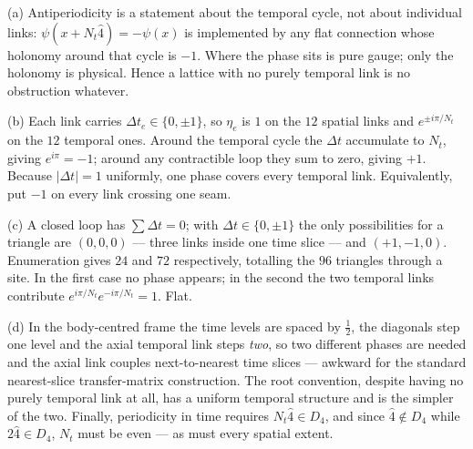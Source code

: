 {(a) Antiperiodicity is a statement about the temporal cycle, not about
individual links: $\psi(x+N_t\hat4)=-\psi(x)$ is implemented by any flat
connection whose holonomy around that cycle is $-1$. Where the phase sits is
pure gauge; only the holonomy is physical. Hence a lattice with no purely
temporal link is no obstruction whatever.

(b) Each link carries $\Delta t_e\in\{0,\pm1\}$, so $\eta_e$ is $1$ on the $12$
spatial links and $e^{\pm i\pi/N_t}$ on the $12$ temporal ones. Around the
temporal cycle the $\Delta t$ accumulate to $N_t$, giving $e^{i\pi}=-1$; around
any contractible loop they sum to zero, giving $+1$. Because $|\Delta t|=1$
uniformly, one phase covers every temporal link. Equivalently, put $-1$ on every
link crossing one seam.

(c) A closed loop has $\sum\Delta t=0$; with $\Delta t\in\{0,\pm1\}$ the only
possibilities for a triangle are $(0,0,0)$ --- three links inside one time slice
--- and $(+1,-1,0)$. Enumeration gives $24$ and $72$ respectively, totalling the
$96$ triangles through a site. In the first case no phase appears; in the second
the two temporal links contribute $e^{i\pi/N_t}e^{-i\pi/N_t}=1$. Flat.

(d) In the body-centred frame the time levels are spaced by $\tfrac12$, the
diagonals step one level and the axial temporal link steps \emph{two}, so two
different phases are needed and the axial link couples next-to-nearest time
slices --- awkward for the standard nearest-slice transfer-matrix construction.
The root convention, despite having no purely temporal link at all, has a
uniform temporal structure and is the simpler of the two. Finally, periodicity
in time requires $N_t\hat4\in D_4$, and since $\hat4\notin D_4$ while
$2\hat4\in D_4$, $N_t$ must be even --- as must every spatial extent.}

